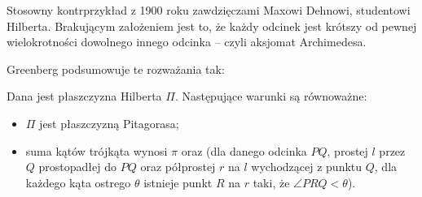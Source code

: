 Stosowny kontrprzykład z 1900 roku zawdzięczami Maxowi Dehnowi, studentowi Hilberta.
Brakującym założeniem jest to, że każdy odcinek jest krótszy od pewnej wielokrotności dowolnego innego odcinka -- czyli aksjomat Archimedesa.

Greenberg podsumowuje te rozważania tak:

\begin{proposition}
    Dana jest płaszczyzna Hilberta $\Pi$.
    Następujące warunki są równoważne:
    \begin{itemize}
        \item $\Pi$ jest płaszczyzną Pitagorasa;
        \item suma kątów trójkąta wynosi $\pi$ oraz (dla danego odcinka $PQ$, prostej $l$ przez $Q$ prostopadłej do $PQ$ oraz półprostej $r$ na $l$ wychodzącej z punktu $Q$, dla każdego kąta ostrego $\theta$ istnieje punkt $R$ na $r$ taki, że $\angle PRQ < \theta$).
    \end{itemize}
\end{proposition}

%